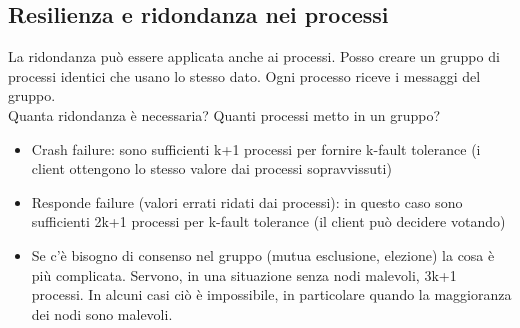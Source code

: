 \documentclass[12pt,italian]{report}
\begin{document}
\subsection{Resilienza e ridondanza nei processi}
La ridondanza può essere applicata anche ai processi. Posso creare un gruppo di processi identici che usano lo stesso dato. Ogni processo riceve i messaggi del gruppo. \\ Quanta ridondanza è necessaria? Quanti processi metto in un gruppo?
\begin{itemize}
    \item Crash failure: sono sufficienti k+1 processi per fornire k-fault tolerance (i client ottengono lo stesso valore dai processi sopravvissuti)
    \item Responde failure (valori errati ridati dai processi): in questo caso sono sufficienti 2k+1 processi per k-fault tolerance (il client può decidere votando)
    \item Se c'è bisogno di consenso nel gruppo (mutua esclusione, elezione) la cosa è più complicata. Servono, in una situazione senza nodi malevoli, 3k+1 processi. In alcuni casi ciò è impossibile, in particolare quando la maggioranza dei nodi sono malevoli. 
\end{itemize}
\end{document}
